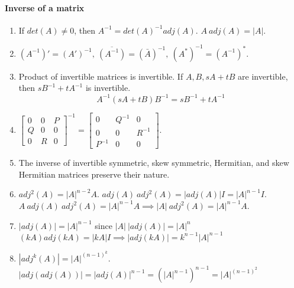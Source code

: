 \paragraph{Inverse of a matrix}
\begin{enumerate}
	\item If $det(A) \ne 0$, then $A^{-1} = det(A)^{-1} adj(A)$.
		\subitem $A\ adj(A) = |A|$.
	\item $(A^{-1})' = (A')^{-1},\ \overline{(A^{-1})} = \left(\bar{A}\right)^{-1},\ (A^\ast)^{-1} = (A^{-1})^\ast$.
	\item Product of invertible matrices is invertible.
		\subitem If $A,B,sA+tB$ are invertible, then $sB^{-1}+tA^{-1}$ is invertible.
		$$ A^{-1}(sA+tB)B^{-1} = sB^{-1}+tA^{-1} $$
	\item $\begin{bmatrix} 0 & 0 & P \\ Q & 0 & 0 \\ 0 & R & 0 \end{bmatrix}^{-1} = \begin{bmatrix} 0 & Q^{-1} & 0 \\ 0 & 0 & R^{-1} \\ P^{-1} & 0 & 0 \end{bmatrix}$.
	\item The inverse of invertible symmetric, skew symmetric, Hermitian, and skew Hermitian matrices preserve their nature.
	\item $adj^2(A) = |A|^{n-2}A$.
		\subitem $adj(A)\ adj^2(A) = |adj(A)|I = |A|^{n-1}I$.
		\subitem $A\ adj(A)\ adj^2(A) = |A|^{n-1} A \implies |A|\ adj^2(A) = |A|^{n-1} A$.
	\item $|adj(A)| = |A|^{n-1}$ since $|A|\ |adj(A)| = |A|^n$
		\subitem $(kA) adj(kA) = |kA|I \implies |adj(kA)| = k^{n-1}|A|^{n-1}$
	\item $|adj^k(A)| = |A|^{(n-1)^k}$.
		\subitem $|adj(adj(A))| = |adj(A)|^{n-1} = (|A|^{n-1})^{n-1} = |A|^{(n-1)^2}$
\end{enumerate}

